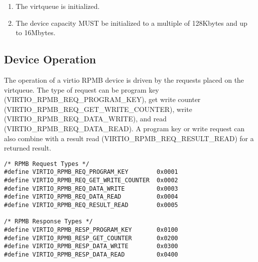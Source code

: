 
\begin{enumerate}
\item The virtqueue is initialized.
\item The device capacity MUST be initialized to a multiple of 128Kbytes and up to
   16Mbytes.
\end{enumerate}

\subsection{Device Operation}\label{sec:Device Types / RPMB Device / Device Operation}

The operation of a virtio RPMB device is driven by the requests placed on the virtqueue.
  The type of request can be program key (VIRTIO_RPMB_REQ_PROGRAM_KEY),
  get write counter (VIRTIO_RPMB_REQ_GET_WRITE_COUNTER),
  write (VIRTIO_RPMB_REQ_DATA_WRITE), and read (VIRTIO_RPMB_REQ_DATA_READ).
  A program key or write request can also combine with a
  result read (VIRTIO_RPMB_REQ_RESULT_READ) for a returned result.

\begin{lstlisting}
/* RPMB Request Types */
#define VIRTIO_RPMB_REQ_PROGRAM_KEY        0x0001
#define VIRTIO_RPMB_REQ_GET_WRITE_COUNTER  0x0002
#define VIRTIO_RPMB_REQ_DATA_WRITE         0x0003
#define VIRTIO_RPMB_REQ_DATA_READ          0x0004
#define VIRTIO_RPMB_REQ_RESULT_READ        0x0005

/* RPMB Response Types */
#define VIRTIO_RPMB_RESP_PROGRAM_KEY       0x0100
#define VIRTIO_RPMB_RESP_GET_COUNTER       0x0200
#define VIRTIO_RPMB_RESP_DATA_WRITE        0x0300
#define VIRTIO_RPMB_RESP_DATA_READ         0x0400
\end{lstlisting}

